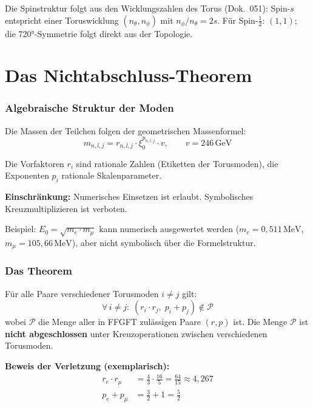 Die Spinstruktur folgt aus den Wicklungszahlen des Torus (Dok.~051):
Spin-$s$ entspricht einer Toruswicklung $(n_\theta, n_\phi)$ mit
$n_\phi/n_\theta = 2s$. Für Spin-$\tfrac{1}{2}$: $(1,1)$; die
720°-Symmetrie folgt direkt aus der Topologie.

\part{Das Nichtabschluss-Theorem}

\section{Algebraische Struktur der Moden}

Die Massen der Teilchen folgen der geometrischen Massenformel:
\begin{equation}
  m_{n,l,j} = r_{n,l,j} \cdot \xi_0^{p_{n,l,j}} \cdot v,
  \qquad v = 246\,\text{GeV}
  \label{eq:massenformel}
\end{equation}

Die Vorfaktoren $r_i$ sind rationale Zahlen (Etiketten der Torusmoden),
die Exponenten $p_i$ rationale Skalenparameter.

\textbf{Einschränkung:} Numerisches Einsetzen ist erlaubt.
Symbolisches Kreuzmultiplizieren ist verboten.

Beispiel: $E_0 = \sqrt{m_e \cdot m_\mu}$ kann numerisch ausgewertet
werden ($m_e = 0{,}511\,\text{MeV}$, $m_\mu = 105{,}66\,\text{MeV}$),
aber nicht symbolisch über die Formelstruktur.

\section{Das Theorem}

\begin{tcolorbox}[colback=blue!5, colframe=blue!60!black, boxrule=0.8pt,
  arc=3pt, left=4mm, right=4mm,
  title={Nichtabschluss-Theorem der FFGFT-Torusmoden}]
Für alle Paare verschiedener Torusmoden $i \neq j$ gilt:
\[
  \forall\, i \neq j:\;
  (r_i \cdot r_j,\; p_i + p_j) \notin \mathcal{P}
\]
wobei $\mathcal{P}$ die Menge aller in FFGFT zulässigen Paare
$(r,p)$ ist. Die Menge $\mathcal{P}$ ist \textbf{nicht abgeschlossen}
unter Kreuzoperationen zwischen verschiedenen Torusmoden.
\end{tcolorbox}

\textbf{Beweis der Verletzung (exemplarisch):}
\begin{align*}
  r_e \cdot r_\mu &= \frac{4}{3} \cdot \frac{16}{5} = \frac{64}{15}
  \approx 4{,}267 \\
  p_e + p_\mu &= \frac{3}{2} + 1 = \frac{5}{2}
\end{align*}

